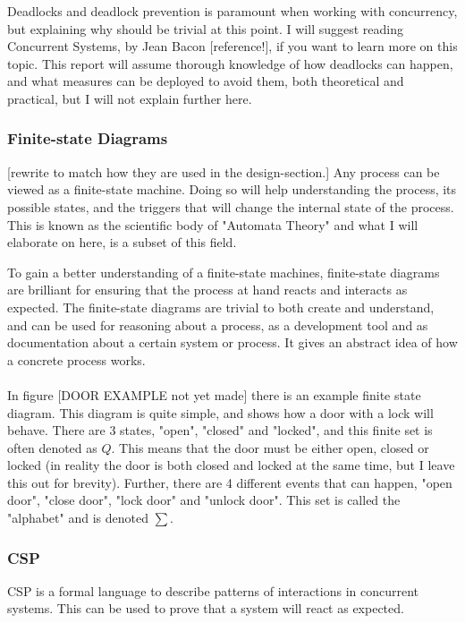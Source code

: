 \documentclass[a4paper]{article}
\begin{document}
Deadlocks and deadlock prevention is paramount when working with concurrency, but explaining why should be trivial at this point.
I will suggest reading Concurrent Systems, by Jean Bacon [reference!], if you want to learn more on this topic. This report will
assume thorough knowledge of how deadlocks can happen, and what measures can be deployed to avoid them, both theoretical and practical,
but I will not explain further here.


\subsubsection{Finite-state Diagrams}
[rewrite to match how they are used in the design-section.]
Any process can be viewed as a finite-state machine. Doing so will help understanding the process,
its possible states, and the triggers that will change the internal state of the process. This is known as the scientific
body of "Automata Theory" and what I will elaborate on here, is a subset of this field.

To gain a better understanding of a finite-state machines, finite-state diagrams are brilliant for ensuring that the process at hand reacts and
interacts as expected. The finite-state diagrams are trivial to both create and understand, and can be used for reasoning about a process,
as a development tool and as documentation about a certain system or process. It gives an abstract idea of how a concrete process works.\\\\

In figure [DOOR EXAMPLE not yet made] there is an example finite state diagram. This diagram is quite simple, and shows how a door with a lock will behave.
There are 3 states, "open", "closed" and "locked", and this finite set is often denoted as $Q$. This means that the door must be either open, closed or locked (in reality the door is both closed and locked at the same time, but I leave this out for brevity). Further, there are 4 different events that can happen, "open door", "close door", "lock door" and "unlock door". This set is called the "alphabet" and is denoted $\sum$.





\subsubsection{CSP}
CSP is a formal language to describe patterns of interactions in concurrent systems. This can be used to prove that a system
will react as expected.
\end{document}
